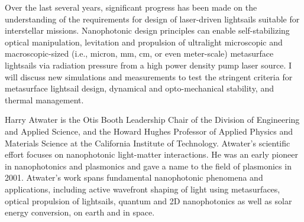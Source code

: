 \documentclass[a4paper,parskip,10pt]{scrartcl}
\begin{document}
    \begin{tcolorbox}[
        enhanced,
        title={Keynote Lecture 4: Harry Atwater (California Institute of Technology) \\  StarShot \textemdash~from physics to spacecraft},
        sharp corners,
        colbacktitle=thistrack,
        fonttitle=\large\mediumfont,
        boxsep=0pt,
        boxrule=0pt,
        left*=0pt,
        lefttitle=4mm,
        toptitle=4mm,
        bottomtitle=4mm,
        top=0pt,
        bottom=0pt,
        sidebyside,
        sidebyside align=center,
        lefthand width=6cm,
        segmentation empty,
    ]%
        
        \tcblower

        \setlength{\parskip}{1ex}
        
        \vspace{1ex}
        Over the last several years, significant progress has been made on the understanding of the requirements for design of laser-driven lightsails suitable for interstellar missions. Nanophotonic design principles can enable self-stabilizing optical manipulation, levitation and propulsion of ultralight microscopic and macroscopic-sized (i.e., micron, mm, cm, or even meter-scale) metasurface lightsails via radiation pressure from a high power density pump laser source. I will discuss new simulations and measurements to test the stringent criteria for metasurface lightsail design, dynamical and opto-mechanical stability, and thermal management.

        {
            \small
            \color{white!20!black}
            Harry Atwater is the Otis Booth Leadership Chair of the Division of Engineering and Applied Science, and the Howard Hughes Professor of Applied Physics and Materials Science at the California Institute of Technology. Atwater's scientific effort focuses on nanophotonic light-matter interactions. He was an early pioneer in nanophotonics and plasmonics and gave a name to the field of plasmonics in 2001. Atwater's work spans fundamental nanophotonic phenomena and applications, including active wavefront shaping of light using metasurfaces, optical propulsion of lightsails, quantum and 2D nanophotonics as well as solar energy conversion, on earth and in space.}


\end{tcolorbox}
\end{document}
